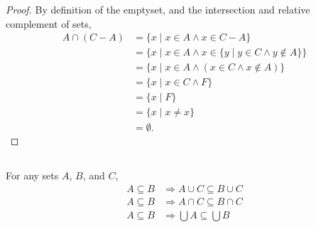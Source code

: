 \documentclass{report}
\begin{document}
\begin{proof}
    By definition of the emptyset, and the intersection and relative complement
      of sets,
      \begin{align*}
        A \cap (C - A)
          & = \{ x \mid x \in A \land x \in C - A \} \\
          & = \{ x \mid x \in A \land
                        x \in \{ y \mid y \in C \land y \not\in A \}\} \\
          & = \{ x \mid x \in A \land (x \in C \land x \not\in A) \} \\
          & = \{ x \mid x \in C \land F \} \\
          & = \{ x \mid F \} \\
          & = \{ x \mid x \neq x \} \\
          & = \emptyset.
      \end{align*}

\end{proof}

\subsection{}%

For any sets $A$, $B$, and $C$,
  \begin{align*}
    A \subseteq B & \Rightarrow A \cup C \subseteq B \cup C \\
    A \subseteq B & \Rightarrow A \cap C \subseteq B \cap C \\
    A \subseteq B & \Rightarrow \bigcup A \subseteq \bigcup B
  \end{align*}
\end{document}
